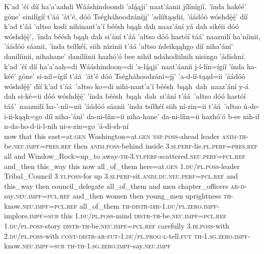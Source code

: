 \ea\label{ex:text7-1-2}
K’ad ’éí díí ha’a’aahdi Wááshindoondi ’alą́ąji’ naat’áanii jílínígíí, ’índa hakéé’ góne’ sinilígíí t’áá ’át’é, dóó Tségháhoodzáníjį’ ’adíítąądii, ’áádóó wóshdę́ę́’ díí k’ad t’áá ’ałtso kodi nihinant’a’í béésh bąąh dah naaz’ání yá dah sikéii dóó wóshdę́ę́’, ’índa béésh bąąh dah si’ání t’áá ’ałtso dóó hastóí táá’ naaznilí ha’níinii, ’áádóó sáanii, ’índa tsíłkéí, siih nízinii t’áá ’ałtso ńdeikąąhgo díí niha’áni’ danilíinii, nihahane’ danilíinii hazhó’ó bee nihił ndahodiilnih nisingo ’ádíshní.\\
\gll k’ad	’éí	díí	ha’a’aah=di	Wááshindoon=di	’a-lą́ąji’	naat’áanii	j-í-lín=ígíí	’índa	ha-kéé’	góne’	si-nil=ígíí	t’áá~{’át’é}	dóó	Tségháhoodzání=jį’	’a-d-íí-tąąd=ii	’áádóó	wóshdę́ę́’	díí	k’ad	t’áá~{’ałtso}	ko=di	nihi-nant’a’í	béésh~bąąh~dah~{naaz’ání}	y-á	dah	si-ké=ii	dóó	wóshdę́ę́’	’índa	béésh~bąąh~dah~{si’ání}	t’áá~{’ałtso}	dóó	hastóí	táá’~{naaznilí}	ha-’-níi=nii	’áádóó	sáanii	’índa	tsíłkéí	siih ní-zin=ii	t’áá~{’ałtso}	ń-de-i-ii-kąąh=go	díí	niha-’áni’	da-ni-líin=ii	niha-hane’	da-ni-líin=ii	hazhó’ó	b-ee	nih-ił	n-da-ho-d-ii-l-nih	ni-s-zin=go	’á-dí-sh-ní\\
     now	that	this	east=at.\textsc{gen}	Washington=at.\textsc{gen}	\textsc{nsp}.\textsc{poss}-ahead	leader	\textsc{anim}-\textsc{th}-be.\textsc{neu}.\textsc{impf}=\textsc{pres}.\textsc{ref}	then	\textsc{anim}.\textsc{poss}-behind	inside	3.\textsc{si}.\textsc{perf}-lie.\textsc{pl}.\textsc{perf}=\textsc{pres}.\textsc{ref}	all	and	Window\_Rock=up\_to	away-\textsc{th}-3.\textsc{yi}.\textsc{perf}-scattered.\textsc{neu}.\textsc{perf}=\textsc{pcl}.\textsc{ref}	and\_then	this\_way	this	now	all\_of\_them	here=at.\textsc{gen}	1.\textsc{du}/\textsc{pl}.\textsc{poss}-leader	Tribal\_Council	3.\textsc{yi}.\textsc{poss}-for	up	3.\textsc{si}.\textsc{perf}-sit.\textsc{anim}.\textsc{du}.\textsc{neu}.\textsc{perf}=\textsc{pcl}.\textsc{ref}	and	this\_way	then	council\_delegate	all\_of\_them	and	men	chapter\_officers	\textsc{ar}-\textsc{d}-say.\textsc{neu}.\textsc{impf}=\textsc{pcl}.\textsc{ref}	and\_then	women	then	young\_men	uprightness \textsc{th}-know.\textsc{neu}.\textsc{impf}=\textsc{pcl}.\textsc{ref}	all\_of\_them	\textsc{th}-\textsc{distr}-\textsc{dir}-1.\textsc{du}/\textsc{pl}.\textsc{zero}.\textsc{impf}-implore.\textsc{impf}=\textsc{sub}	this	1.\textsc{du}/\textsc{pl}.\textsc{poss}-mind	\textsc{distr}-\textsc{th}-be.\textsc{neu}.\textsc{impf}=\textsc{pcl}.\textsc{ref}	1.\textsc{du}/\textsc{pl}.\textsc{poss}-story	\textsc{distr}-\textsc{th}-be.\textsc{neu}.\textsc{impf}=\textsc{pcl}.\textsc{ref}	carefully	3.\textsc{bi}.\textsc{poss}-with	2.\textsc{du}/\textsc{pl}.\textsc{poss}-with	\textsc{cont}-\textsc{distr}-\textsc{ar}-\textsc{fut}-1.\textsc{du}/\textsc{pl}.\textsc{prog}-\textsc{l}-tell.\textsc{fut}	\textsc{th}-1.\textsc{sg}.\textsc{zero}.\textsc{impf}-know.\textsc{neu}.\textsc{impf}=\textsc{sub}	\textsc{th}-\textsc{th}-1.\textsc{sg}.\textsc{zero}.\textsc{impf}-say.\textsc{neu}.\textsc{impf}\\
